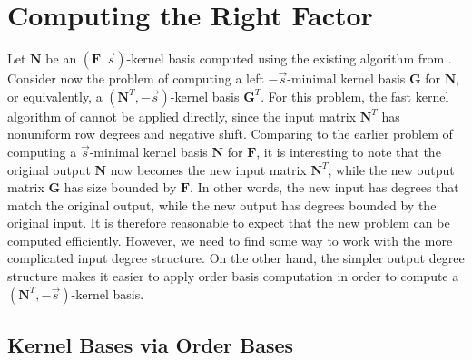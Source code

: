 
\section{\label{sec:computeRightFactor}Computing the Right Factor}

Let $\mathbf{N}$ be an $\left(\mathbf{F},\vec{s}\right)$-kernel
basis computed using the existing algorithm from \cite{za2012}. Consider
now the problem of computing a left $-\vec{s}$-minimal kernel basis
$\mathbf{G}$ for $\mathbf{N}$, or equivalently, a $\left(\mathbf{N}^{T},-\vec{s}\right)$-kernel
basis $\mathbf{G}^{T}$. For this problem, the fast kernel algorithm
of \cite{za2012} cannot be applied directly, since the input matrix
$\mathbf{N}^{T}$ has nonuniform row degrees and negative shift. Comparing
to the earlier problem of computing a $\vec{s}$-minimal kernel basis
$\mathbf{N}$ for $\mathbf{F}$, it is interesting to note that the
original output $\mathbf{N}$ now becomes the new input matrix $\mathbf{N}^{T}$,
while the new output matrix $\mathbf{G}$ has size bounded by $\mathbf{F}$.
In other words, the new input has degrees that match the original
output, while the new output has degrees bounded by the original input.
It is therefore reasonable to expect that the new problem can be computed
efficiently. However, we need to find some way to work with the more
complicated input degree structure. On the other hand, the simpler
output degree structure makes it easier to apply order basis computation
in order to compute a $\left(\mathbf{N}^{T},-\vec{s}\right)$-kernel
basis.


\subsection{Kernel Bases via Order Bases}

